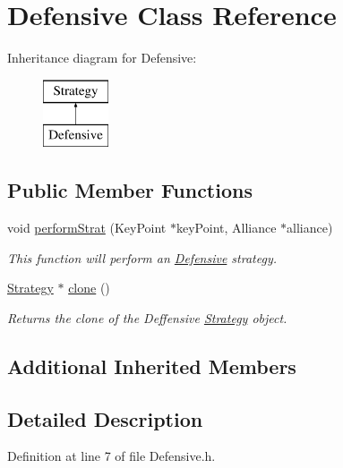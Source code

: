 \hypertarget{classDefensive}{}\section{Defensive Class Reference}
\label{classDefensive}
Inheritance diagram for Defensive\+:\begin{figure}[H]
\begin{center}
\leavevmode
\includegraphics[height=2.000000cm]{classDefensive}
\end{center}
\end{figure}
\subsection*{Public Member Functions}
\begin{DoxyCompactItemize}
\item 
void \hyperlink{classDefensive_a4cc4f2f71160bcade2cf2be8ade39903}{perform\+Strat} (Key\+Point $\ast$key\+Point, Alliance $\ast$alliance)
\begin{DoxyCompactList}\small\item\em This function will perform an \hyperlink{classDefensive}{Defensive} strategy. \end{DoxyCompactList}\item 
\hyperlink{classStrategy}{Strategy} $\ast$ \hyperlink{classDefensive_afad21efc8bf51879f85f9d02e695cfa6}{clone} ()
\begin{DoxyCompactList}\small\item\em Returns the clone of the Deffensive \hyperlink{classStrategy}{Strategy} object. \end{DoxyCompactList}\end{DoxyCompactItemize}
\subsection*{Additional Inherited Members}


\subsection{Detailed Description}


Definition at line 7 of file Defensive.\+h.



